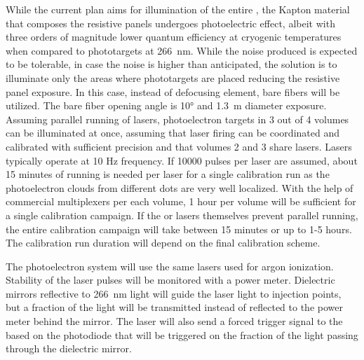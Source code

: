 While the current plan aims for illumination of the entire , the Kapton material that composes the resistive panels undergoes photoelectric effect, albeit with three orders of magnitude lower quantum efficiency at cryogenic temperatures when compared to phototargets at \SI{266}{\nano\m}. While the noise produced is expected to be tolerable, in case the noise is higher than anticipated, the solution is to illuminate only the areas where phototargets are placed reducing the resistive panel exposure. In this case, instead of defocusing element, bare fibers will be utilized. The bare fiber opening angle is \ang{10} and \SI{1.3}{\m} diameter exposure.   
Assuming parallel running of lasers, photoelectron targets in 3 out of 4 volumes can be illuminated at once, assuming that laser firing can be coordinated and calibrated with sufficient precision and that volumes 2 and 3 share lasers. Lasers typically operate at 10 Hz frequency. If 10000 pulses per laser are assumed, about 15 minutes of running is needed per laser for a single calibration run
as the photoelectron clouds from different dots are very well localized.
With the help of commercial multiplexers per each volume, 1 hour per volume will be sufficient for a single calibration campaign. If the  or lasers themselves prevent parallel running, the entire calibration campaign will take between 15 minutes or up to 1-5 hours. The calibration run duration will depend on the final calibration scheme.

The photoelectron system will use the same lasers used for argon ionization. Stability of the laser pulses will be monitored  with  a power meter. Dielectric mirrors reflective to \SI{266}{\nano\m} light will guide the laser light to injection points, but a fraction of the light will be transmitted instead of reflected to the power meter behind the mirror. The laser will also send a forced trigger signal to the  based on the photodiode that will be triggered on the fraction of the light passing through the dielectric mirror. 

